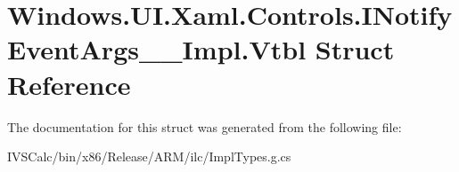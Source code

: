 \hypertarget{struct_windows_1_1_u_i_1_1_xaml_1_1_controls_1_1_i_notify_event_args_____impl_1_1_vtbl}{}\section{Windows.\+U\+I.\+Xaml.\+Controls.\+I\+Notify\+Event\+Args\+\_\+\+\_\+\+Impl.\+Vtbl Struct Reference}
\label{struct_windows_1_1_u_i_1_1_xaml_1_1_controls_1_1_i_notify_event_args_____impl_1_1_vtbl}


The documentation for this struct was generated from the following file\+:\begin{DoxyCompactItemize}
\item 
I\+V\+S\+Calc/bin/x86/\+Release/\+A\+R\+M/ilc/Impl\+Types.\+g.\+cs\end{DoxyCompactItemize}
